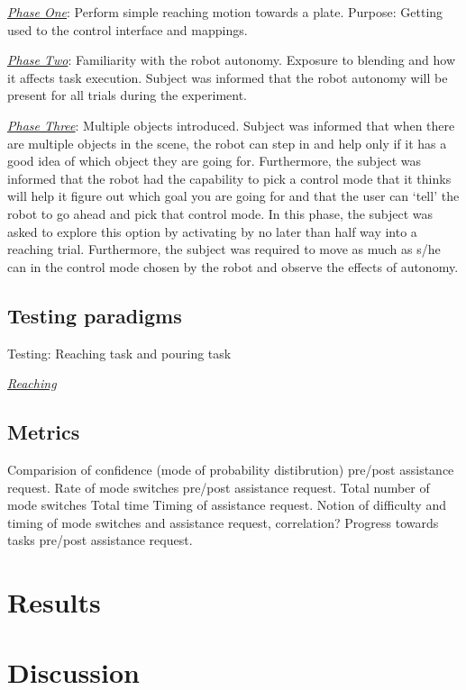\noindent\underline{\textit{Phase One}}: Perform simple reaching motion towards a plate. Purpose: Getting used to the control interface and mappings. 

\noindent\underline{\textit{Phase Two}}: Familiarity with the robot autonomy. Exposure to blending and how it affects task execution. Subject was informed that the robot autonomy will be present for all trials during the experiment. 

\noindent\underline{\textit{Phase Three}}: Multiple objects introduced. Subject was informed that when there are multiple objects in the scene, the robot can step in and help only if it has a good idea of which object they are going for. Furthermore, the subject was informed that the robot had the capability to pick a control mode that it thinks will help it figure out which goal you are going for and that the user can `tell' the robot to go ahead and pick that control mode. 
In this phase, the subject was asked to explore this option by activating by no later than half way into a reaching trial. Furthermore, the subject was required to move as much as s/he can in the control mode chosen by the robot and observe the effects of autonomy. 


\subsection{Testing paradigms}\label{ssec:testing_paradigms}
Testing: Reaching task and pouring task

\noindent\underline{\textit{Reaching}}


\subsection{Metrics}
Comparision of confidence (mode of probability distibrution) pre/post assistance request. 
Rate of mode switches pre/post assistance request. 
Total number of mode switches
Total time
Timing of assistance request. Notion of difficulty and timing of mode switches and assistance request, correlation?
Progress towards tasks pre/post assistance request. 


\section{Results}\label{sec:results}
\section{Discussion}\label{sec:discussions}

